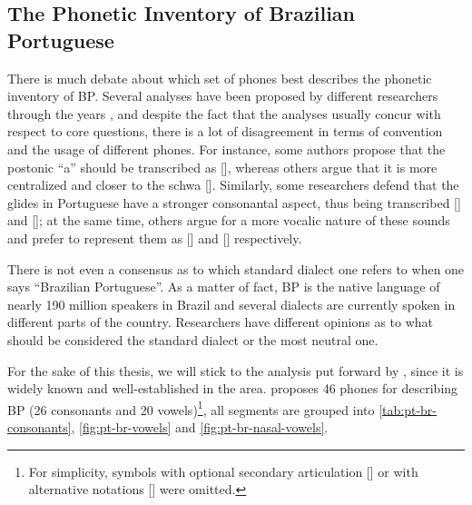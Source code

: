 \subsection{The Phonetic Inventory of Brazilian Portuguese} 

There is much debate about which set of phones best describes the phonetic inventory of \gls{BP}. Several analyses have been proposed by different researchers through the years \cite{Bisol2005, Cagliari2002, Camara1970, Cristofaro2005, Neves1999}, and despite the fact that the analyses usually concur with respect to core questions, there is a lot of disagreement in terms of convention and the usage of different phones.  For instance, some authors propose that the postonic ``a'' should be transcribed as [], whereas others argue that it is more centralized and closer to the schwa []. Similarly, some researchers defend that the glides in Portuguese have a stronger consonantal aspect, thus being transcribed [] and []; at the same time, others argue for a more vocalic nature of these sounds and prefer to represent them as [] and [] respectively. 

There is not even a consensus as to which standard dialect one refers to when one says ``Brazilian Portuguese''. As a matter of fact, \gls{BP} is the native language of nearly 190 million speakers in Brazil \cite{Ethnologue2005} and several dialects are currently spoken in different parts of the country. Researchers have different opinions as to what should be considered the standard dialect or the most neutral one.

For the sake of this thesis, we will stick to the analysis put forward by \citet{Cristofaro2005}, since it is widely known and well-established in the area. \citet{Cristofaro2005} proposes 46 phones for describing \gls{BP} (26 consonants and 20 vowels)\footnote{For simplicity, symbols with optional secondary articulation [] or with alternative notations [] were omitted.}, all segments are grouped into \autoref{tab:pt-br-consonants}, \autoref{fig:pt-br-vowels} and \autoref{fig:pt-br-nasal-vowels}.

